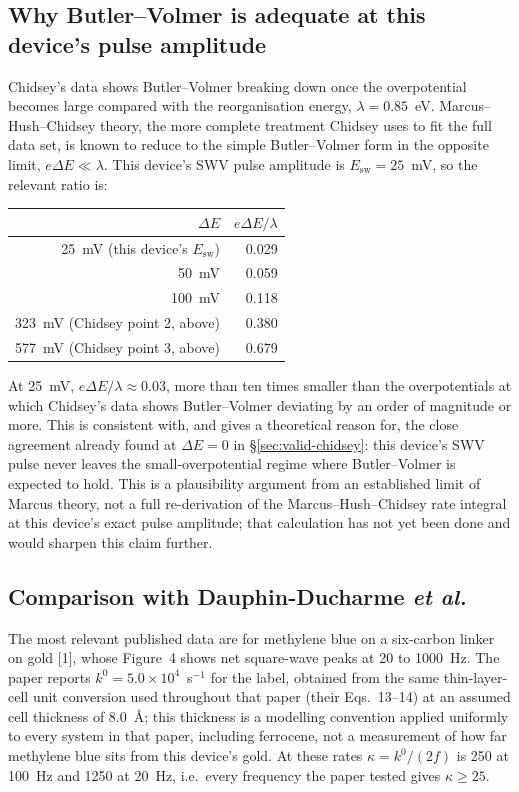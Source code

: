 \documentclass[10pt,a4paper]{article}
\numberwithin{equation}{section}
\newcommand{\cit}[1]{[#1]}
\newcommand{\kzero}{k^0}
\newcommand{\kappaDDhundred}{250}
\newcommand{\kappaDDtwenty}{1250}
\begin{document}
\subsection{Why Butler--Volmer is adequate at this device's pulse amplitude}
\label{sec:valid-mhc}

Chidsey's data shows Butler--Volmer breaking down once the overpotential becomes large compared with the
reorganisation energy, $\lambda=0.85$~eV. Marcus--Hush--Chidsey theory, the more complete treatment Chidsey
uses to fit the full data set, is known to reduce to the simple Butler--Volmer form in the opposite limit,
$e\Delta E\ll\lambda$. This device's SWV pulse amplitude is $E_{\mathrm{sw}}=25$~mV, so the relevant ratio
is:

\begin{center}
\small\renewcommand{\arraystretch}{1.2}
\begin{tabular}{@{}rr@{}}
\toprule
$\Delta E$ & $e\Delta E/\lambda$ \\
\midrule
25~mV (this device's $E_{\mathrm{sw}}$)  & 0.029 \\
50~mV   & 0.059 \\
100~mV  & 0.118 \\
323~mV (Chidsey point 2, above) & 0.380 \\
577~mV (Chidsey point 3, above) & 0.679 \\
\bottomrule
\end{tabular}
\end{center}

At 25~mV, $e\Delta E/\lambda\approx0.03$, more than ten times smaller than the overpotentials at which
Chidsey's data shows Butler--Volmer deviating by an order of magnitude or more. This is consistent with,
and gives a theoretical reason for, the close agreement already found at $\Delta E=0$ in
\S\ref{sec:valid-chidsey}: this device's SWV pulse never leaves the small-overpotential regime where
Butler--Volmer is expected to hold. This is a plausibility argument from an established limit of Marcus
theory, not a full re-derivation of the Marcus--Hush--Chidsey rate integral at this device's exact pulse
amplitude; that calculation has not yet been done and would sharpen this claim further.

\subsection{Comparison with Dauphin-Ducharme \emph{et al.}}
\label{sec:valid-dd}

The most relevant published data are for methylene blue on a six-carbon linker on gold \cit{1}, whose
Figure~4 shows net square-wave peaks at 20 to 1000~Hz. The paper reports $\kzero=5.0\times10^4$~s$^{-1}$
for the label, obtained from the same thin-layer-cell unit conversion used throughout that paper (their
Eqs.~13--14) at an assumed cell thickness of 8.0~\AA; this thickness is a modelling convention applied
uniformly to every system in that paper, including ferrocene, not a measurement of how far methylene blue
sits from this device's gold. At these rates $\kappa=\kzero/(2f)$ is \kappaDDhundred{} at 100~Hz and
\kappaDDtwenty{} at 20~Hz, i.e.\ every frequency the paper tested gives $\kappa\geq25$.
\end{document}
